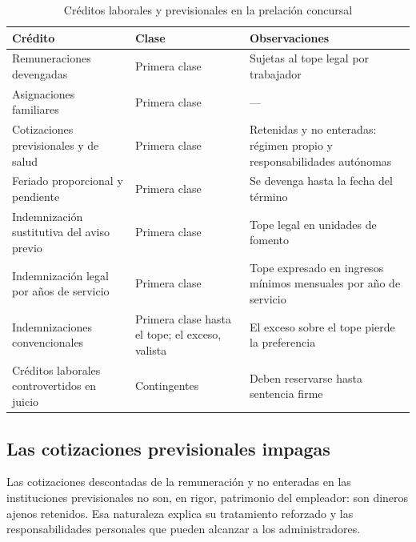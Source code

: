\begin{table}[htbp]
\centering
\small
\caption{Créditos laborales y previsionales en la prelación concursal}
\label{tab:creditos-laborales}
\begin{tabularx}{\textwidth}{@{}>{\raggedright\arraybackslash}p{} p{} X@{}}
\toprule
\textbf{Crédito} & \textbf{Clase} & \textbf{Observaciones} \\
\midrule
Remuneraciones devengadas & Primera clase & Sujetas al tope legal por trabajador \\
\addlinespace
Asignaciones familiares & Primera clase & — \\
\addlinespace
Cotizaciones previsionales y de salud & Primera clase & Retenidas y no enteradas: régimen
propio y responsabilidades autónomas \\
\addlinespace
Feriado proporcional y pendiente & Primera clase & Se devenga hasta la fecha del término \\
\addlinespace
Indemnización sustitutiva del aviso previo & Primera clase & Tope legal en unidades de
fomento \\
\addlinespace
Indemnización legal por años de servicio & Primera clase & Tope expresado en ingresos
mínimos mensuales por año de servicio \\
\addlinespace
Indemnizaciones convencionales & Primera clase hasta el tope; el exceso, valista
& El exceso sobre el tope pierde la preferencia \\
\addlinespace
Créditos laborales controvertidos en juicio & Contingentes & Deben reservarse hasta
sentencia firme \\
\bottomrule
\end{tabularx}
\end{table}


\subsection{Las cotizaciones previsionales impagas}

Las cotizaciones descontadas de la remuneración y no enteradas en las instituciones
previsionales no son, en rigor, patrimonio del empleador: son dineros ajenos retenidos.
Esa naturaleza explica su tratamiento reforzado y las responsabilidades personales que
pueden alcanzar a los administradores.

